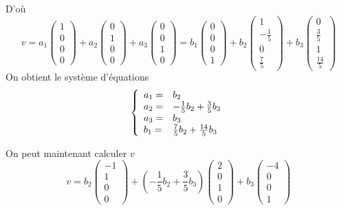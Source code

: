 \documentclass[]{book}
\theoremstyle{definition}
\begin{document}
D'o\`u
$$
v= 
a_1\begin{pmatrix}1\\0\\0\\0\end{pmatrix}+a_2\begin{pmatrix}0\\1\\0\\0\end{pmatrix}+a_3\begin{pmatrix}0\\0\\1\\0\end{pmatrix}
= b_1\begin{pmatrix}0\\0\\0\\1\end{pmatrix}+b_2\begin{pmatrix}1\\-\frac{1}{5}\\0\\\frac{7}{5}\end{pmatrix}+b_3\begin{pmatrix}0\\\frac{3}{5}\\1\\\frac{14}{5}\end{pmatrix}
$$
On obtient le syst\`eme d'\'equations
$$
\left\{ 
\begin{array}{l l}
a_1 =  & b_2\\
a_2 = & -\frac{1}{5}b_2+\frac{3}{5}b_3\\
a_3 = & b_3\\
b_1 = & \frac{7}{5}b_2 + \frac{14}{5}b_3\\
\end{array}
\right. 
$$ 

On peut maintenant calculer $v$
$$
v= 
b_2\begin{pmatrix}-1\\1\\0\\0\end{pmatrix}+(-\frac{1}{5}b_2+\frac{3}{5}b_3)\begin{pmatrix}2\\0\\1\\0\end{pmatrix}+b_3\begin{pmatrix}-4\\0\\0\\1\end{pmatrix}
$$
\end{document}
